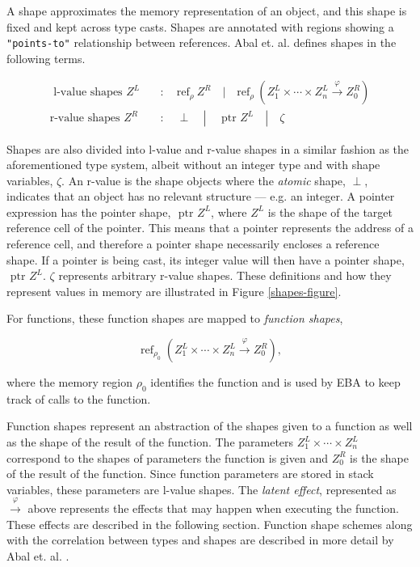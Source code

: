 \newpar A shape approximates the memory representation of an object, and this shape is fixed and kept across type casts. Shapes are annotated with regions showing a \texttt{"points-to"} relationship between references. Abal et. al. defines shapes in the following terms. 

\begin{equation*}
\begin{aligned}
    \text { l-value shapes } Z^L \quad &: \quad \text{ref}_{\rho} \:Z^R \quad | \quad \text{ref}_{\rho}\:(Z_1^L \times \cdots \times Z_n^L \stackrel{\varphi}{\rightarrow} Z_0^R)\\
    \text {r-value shapes } Z^R \quad &: \quad \perp \quad | \quad \text { ptr } Z^L \quad | \quad \zeta
\end{aligned}
\end{equation*} 

\noindent Shapes are also divided into l-value and r-value shapes in a similar fashion as the aforementioned type system, albeit without an integer type and with shape variables, $\zeta$. An r-value is the shape objects where the \textit{atomic} shape, $\perp$, indicates that an object has no relevant structure --- e.g. an integer. A pointer expression has the pointer shape, $\text{ ptr } Z^L$, where $Z^L$ is the shape of the target reference cell of the pointer. This means that a pointer represents the address of a reference cell, and therefore a pointer shape necessarily encloses a reference shape. If a pointer is being cast, its integer value will then have a pointer shape, $\text{ ptr } Z^L$. $\zeta$ represents arbitrary r-value shapes. These definitions and how they represent values in memory are illustrated in Figure \ref{shapes-figure}.

\newpar For functions, these function shapes are mapped to \textit{function shapes},

\begin{equation*}
    \operatorname{ref}_{\rho_{0}}\left(Z_{1}^{L} \times \cdots \times Z_{n}^{L} \stackrel{\varphi}{\rightarrow} Z_{0}^{R}\right),
\end{equation*} 

\noindent where the memory region $\rho_0$ identifies the function and is used by EBA to keep track of calls to the function.

\newpar Function shapes represent an abstraction of the shapes given to a function as well as the shape of the result of the function. The parameters $Z_{1}^{L} \times \cdots \times Z_{n}^{L}$ correspond to the shapes of parameters the function is given and $Z_{0}^{R}$ is the shape of the result of the function. Since function parameters are stored in stack variables, these parameters are l-value shapes. The \textit{latent effect}, represented as $\stackrel{\varphi}{\rightarrow}$ above represents the effects that may happen when executing the function. These effects are described in the following section. Function shape schemes along with the correlation between types and shapes are described in more detail by Abal et. al. \cite{Abal2017EffectiveBF}. 


